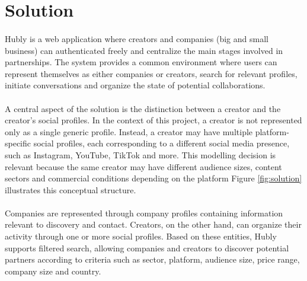 \newpage
\section{Solution}
\paragraph{}Hubly is a web application where creators and companies (big and small business) can authenticated freely and centralize the main stages involved in partnerships. The system provides a common environment where users can represent themselves as either companies or creators, search for relevant profiles, initiate conversations and organize the state of potential collaborations.
\paragraph{}A central aspect of the solution is the distinction between a creator and the creator’s social profiles. In the context of this project, a creator is not represented only as a single generic profile. Instead, a creator may have multiple platform-specific social profiles, each corresponding to a different social media presence, such as Instagram, YouTube, TikTok and more. This modelling decision is relevant because the same creator may have different audience sizes, content sectors and commercial conditions depending on the platform Figure \ref{fig:solution} illustrates this conceptual structure.
\paragraph{}Companies are represented through company profiles containing information relevant to discovery and contact. Creators, on the other hand, can organize their activity through one or more social profiles. Based on these entities, Hubly supports filtered search, allowing companies and creators to discover potential partners according to criteria such as sector, platform, audience size, price range, company size and country.
